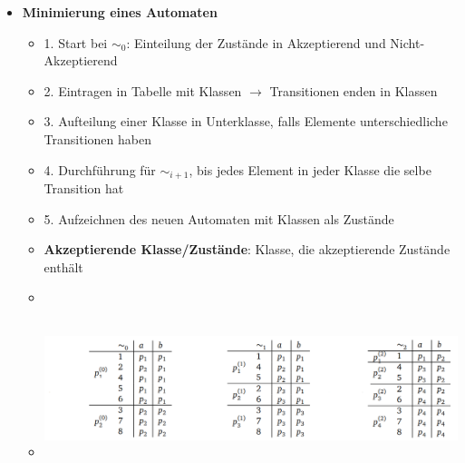 \documentclass[11pt,a4paper]{article}
\begin{document}
\begin{itemize}
\begin{itemize}
	\end{itemize}
		
		
\item {\large \textbf{Minimierung eines Automaten}}
	\begin{itemize}
	\item 1. Start bei $\sim_0$: Einteilung der Zustände in Akzeptierend und Nicht-Akzeptierend
	\item 2. Eintragen in Tabelle mit Klassen $\rightarrow$ Transitionen enden in Klassen
	\item 3. Aufteilung einer Klasse in Unterklasse, falls Elemente unterschiedliche Transitionen haben
	\item 4. Durchführung für $\sim_{i+1}$, bis jedes Element in jeder Klasse die selbe Transition hat
	\item 5. Aufzeichnen des neuen Automaten mit Klassen als Zustände
	\item \textbf{Akzeptierende Klasse/Zustände}: Klasse, die akzeptierende Zustände enthält
	\item[]
	\item[]
		\begin{center}
		\includegraphics[height=4cm]{Bilder/minautomatbsp}
		\end{center}
	\end{itemize}			

\pagebreak



\end{itemize}
\end{document}
